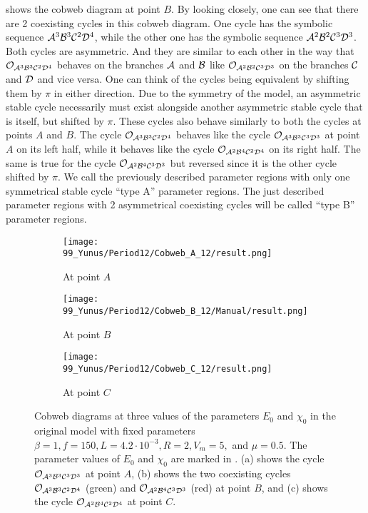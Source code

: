  shows the cobweb diagram at point $B$.
By looking closely, one can see that there are 2 coexisting cycles in this cobweb diagram.
One cycle has the symbolic sequence $\mathcal{A}^3\mathcal{B}^3\mathcal{C}^2\mathcal{D}^4$, while the other one has the symbolic sequence $\mathcal{A}^2\mathcal{B}^2\mathcal{C}^3\mathcal{D}^3$.
Both cycles are asymmetric.
And they are similar to each other in the way that $\mathcal{O}_{\mathcal{A}^3\mathcal{B}^3\mathcal{C}^2\mathcal{D}^4}$ behaves on the branches $\mathcal{A}$ and $\mathcal{B}$ like $\mathcal{O}_{\mathcal{A}^2\mathcal{B}^2\mathcal{C}^3\mathcal{D}^3}$ on the branches $\mathcal{C}$ and $\mathcal{D}$ and vice versa.
One can think of the cycles being equivalent by shifting them by $\pi$ in either direction.
Due to the symmetry of the model, an asymmetric stable cycle necessarily must exist alongside another asymmetric stable cycle that is itself, but shifted by $\pi$.
These cycles also behave similarly to both the cycles at points $A$ and $B$.
The cycle $\mathcal{O}_{\mathcal{A}^3\mathcal{B}^3\mathcal{C}^2\mathcal{D}^4}$ behaves like the cycle $\mathcal{O}_{\mathcal{A}^3\mathcal{B}^3\mathcal{C}^3\mathcal{D}^3}$ at point $A$ on its left half, while it behaves like the cycle $\mathcal{O}_{\mathcal{A}^2\mathcal{B}^4\mathcal{C}^2\mathcal{D}^4}$ on its right half.
The same is true for the cycle $\mathcal{O}_{\mathcal{A}^2\mathcal{B}^4\mathcal{C}^3\mathcal{D}^3}$ but reversed since it is the other cycle shifted by $\pi$.
We call the previously described parameter regions with only one symmetrical stable cycle ``type A'' parameter regions.
The just described parameter regions with 2 asymmetrical coexisting cycles will be called ``type B'' parameter regions.

\begin{figure}
	\centering
	\begin{subfigure}{0.3\textwidth}
		\centering
		\texttt{[image: 99\_Yunus/Period12/Cobweb\_A\_12/result.png]}
		\caption{At point $A$}
		\label{fig:state.og.dynamics.cobweb.A}
	\end{subfigure}
	\begin{subfigure}{0.3\textwidth}
		\centering
		\texttt{[image: 99\_Yunus/Period12/Cobweb\_B\_12/Manual/result.png]}
		\caption{At point $B$}
		\label{fig:state.og.dynamics.cobweb.B}
	\end{subfigure}
	\begin{subfigure}{0.3\textwidth}
		\centering
		\texttt{[image: 99\_Yunus/Period12/Cobweb\_C\_12/result.png]}
		\caption{At point $C$}
		\label{fig:state.og.dynamics.cobweb.C}
	\end{subfigure}
	\caption[Cobweb diagrams of the original model]{
		Cobweb diagrams at three values of the parameters $E_0$ and $\chi_0$ in the original model with fixed parameters $\beta = 1, f = 150, L = 4.2 \cdot 10^{-3}, R = 2, V_m = 5,$ and $\mu = 0.5$.
		The parameter values of $E_0$ and $\chi_0$ are marked in .
		(a) shows the cycle $\mathcal{O}_{\mathcal{A}^3\mathcal{B}^3\mathcal{C}^3\mathcal{D}^3}$ at point $A$, (b) shows the two coexisting cycles $\mathcal{O}_{\mathcal{A}^3\mathcal{B}^3\mathcal{C}^2\mathcal{D}^4}$ (green) and $\mathcal{O}_{\mathcal{A}^2\mathcal{B}^4\mathcal{C}^3\mathcal{D}^3}$ (red) at point $B$, and (c) shows the cycle $\mathcal{O}_{\mathcal{A}^2\mathcal{B}^4\mathcal{C}^2\mathcal{D}^4}$ at point $C$.
	}
	\label{fig:state.og.dynamics.cobwebs}
\end{figure}


